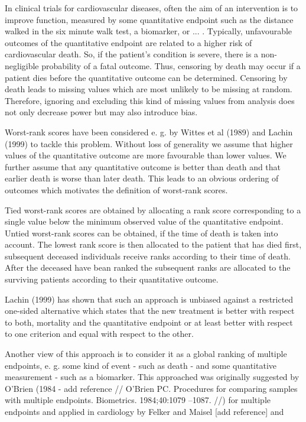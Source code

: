 \documentclass[bimj,fleqn]{w-art}\usepackage[]{graphicx}\usepackage[]{color}
\theoremstyle{plain}
\theoremstyle{definition}
\begin{document}
  In clinical trials for cardiovascular diseases, often the aim of an
  intervention is to improve function, measured by some quantitative endpoint
  such as the distance walked in the six minute walk test, a biomarker, or ... .
  Typically, unfavourable outcomes of the quantitative endpoint are related to a
  higher risk of cardiovascular death. So, if the patient's condition is severe,
  there is a non-negligible probability of a fatal outcome. Thus, censoring by
  death may occur if a patient dies before the quantitative outcome can be
  determined. Censoring by death leads to missing values which are most unlikely
  to be missing at random. Therefore, ignoring and excluding this kind of
  missing values from analysis does not only decrease power but may also
  introduce bias.

  Worst-rank scores have been considered e. g. by Wittes et al (1989) and Lachin
  (1999) to tackle this problem. Without loss of generality we assume that
  higher values of the quantitative outcome are more favourable than lower
  values. We further assume that any quantitative outcome is better than death
  and that earlier death is worse than later death. This leads to an obvious
  ordering of outcomes which motivates the definition of worst-rank scores.

  Tied worst-rank scores are obtained by allocating a rank score corresponding
  to a single value below the minimum observed value of the quantitative
  endpoint. Untied worst-rank scores can be obtained, if the time of death is
  taken into account. The lowest rank score is then allocated to the patient
  that has died first, subsequent deceased individuals receive ranks according
  to their time of death. After the deceased have bean ranked the subsequent
  ranks are allocated to the surviving patients according to their quantitative
  outcome.

  Lachin (1999) has shown that such an approach is unbiased against a restricted
  one-sided alternative which states that the new treatment is better with
  respect to both, mortality and the quantitative endpoint or at least better
  with respect to one criterion and equal with respect to the other.

  Another view of this approach is to consider it as a global ranking of
  multiple endpoints, e. g. some kind of event - such as death - and some
  quantitative measurement - such as a biomarker. This approached was originally
  suggested by O'Brien (1984 - add reference
  // O’Brien PC. Procedures for comparing samples with multiple endpoints.
     Biometrics. 1984;40:1079 –1087. //) for multiple endpoints and
  applied in cardiology by Felker and Maisel [add reference] and
\end{document}
